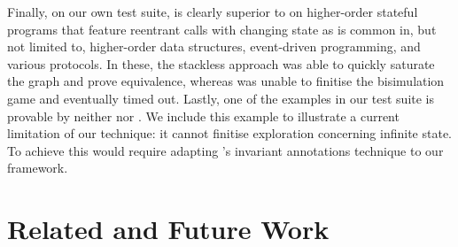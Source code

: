 Finally, on our own test suite, \SLHobbit{} is clearly superior to \Hobbit{} on higher-order stateful programs that feature reentrant calls with changing state as is common in, but not limited to, higher-order data structures, event-driven programming, and various protocols. In these, the stackless approach was able to quickly saturate the graph and prove equivalence, whereas \Hobbit{} was unable to finitise the bisimulation game and eventually timed out. Lastly, one of the examples in our test suite is provable by neither \SLHobbit{} nor \Hobbit{}. We include this example to illustrate a current limitation of our technique: it cannot finitise exploration concerning infinite state. To achieve this would require adapting \Hobbit{}'s invariant annotations technique to our framework.



\section{Related and Future Work}
\label{sec:outro}

